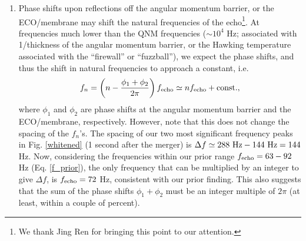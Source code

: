 \documentclass[12pt]{article}
\begin{document}
\begin{enumerate}
\item Phase shifts upon reflections off the angular momentum barrier, or the ECO/membrane may shift the natural frequencies of the echo\footnote{We thank Jing Ren for bringing this point to our attention.}. At frequencies much lower than the QNM frequencies ($\sim 10^4$ Hz; associated with 1/thickness of the angular momentum barrier, or the Hawking temperature associated with the ``firewall'' or ``fuzzball''), we expect the phase shifts, and thus the shift in natural frequencies to approach a constant, i.e. 
\begin{equation}
f_{n} = \left(n- \frac{\phi_1+\phi_2}{2\pi}\right)f_{\rm echo} \simeq n f_{\rm echo} + {\rm const.},   
\end{equation}
where $\phi_1$ and $\phi_2$ are phase shifts at the angular momentum barrier and the ECO/membrane, respectively. However, note that this does not change the spacing of the $f_n$'s. The spacing of our two most significant frequency peaks in Fig. \ref{whitened} (1 second after the merger) is $\Delta f \simeq 288 ~{\rm Hz} - 144~ {\rm Hz} = 144$ Hz. Now, considering the frequencies within our prior range $f_{\rm echo} =63-92$ Hz (Eq. \ref{f_prior}), the only frequency that can be multiplied by an integer to give $\Delta f$, is $f_{\rm echo} = 72$ Hz, consistent with our prior finding. This also suggests that the sum of the phase shifts $\phi_1+\phi_2$ must be an integer multiple of $2\pi$ (at least, within a couple of percent).  


\end{enumerate}
\end{document}
